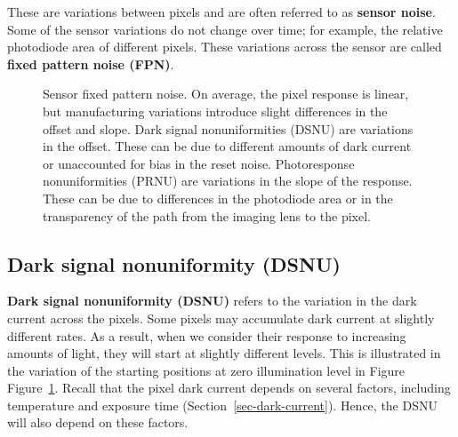 \documentclass[
  letterpaper,
]{book}
\begin{document}
These are variations between pixels and are often referred to as
\textbf{sensor noise}. Some of the sensor variations do not change over
time; for example, the relative photodiode area of different pixels.
These variations across the sensor are called \textbf{fixed pattern
noise (FPN)}.

\begin{figure}


\caption{\label{fig-sensor-noise}Sensor fixed pattern noise. On average,
the pixel response is linear, but manufacturing variations introduce
slight differences in the offset and slope. Dark signal nonuniformities
(DSNU) are variations in the offset. These can be due to different
amounts of dark current or unaccounted for bias in the reset noise.
Photoresponse nonuniformities (PRNU) are variations in the slope of the
response. These can be due to differences in the photodiode area or in
the transparency of the path from the imaging lens to the pixel.}

\end{figure}%

\subsection{Dark signal nonuniformity
(DSNU)}\label{sec-dark-signal-nonuniformity}

\textbf{Dark signal nonuniformity (DSNU)} refers to the variation in the
dark current across the pixels. Some pixels may accumulate dark current
at slightly different rates. As a result, when we consider their
response to increasing amounts of light, they will start at slightly
different levels. This is illustrated in the variation of the starting
positions at zero illumination level in Figure
Figure~\ref{fig-sensor-noise}. Recall that the pixel dark current
depends on several factors, including temperature and exposure time
(Section~\ref{sec-dark-current}). Hence, the DSNU will also depend on
these factors.
\end{document}
